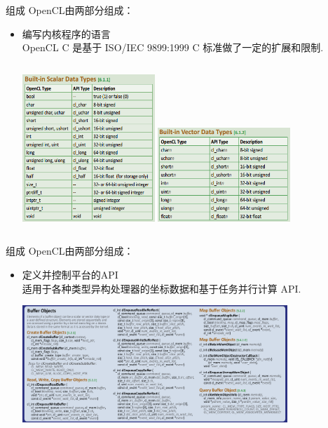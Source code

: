 \documentclass{beamer}
\begin{document}
\begin{frame}{组成}
    OpenCL由两部分组成：
    \begin{itemize}
          \item 编写内核程序的语言\\
                OpenCL C 是基于 ISO/IEC 9899:1999 C 标准做了一定的扩展和限制.
                \begin{columns}[t]
                        \centering
                        \includegraphics[width=5cm]{scalarType.png}
                        \centering
                        \includegraphics[width=5cm]{vectorType.png}
                \end{columns}
    \end{itemize}
\end{frame}

\begin{frame}{组成}
    OpenCL由两部分组成：
    \begin{itemize}
          \item 定义并控制平台的API\\
                适用于各种类型异构处理器的坐标数据和基于任务并行计算
                API.
                \begin{center}
                \includegraphics[width=10cm]{API.png}
                \end{center}

    \end{itemize}
\end{frame}
\end{document}
